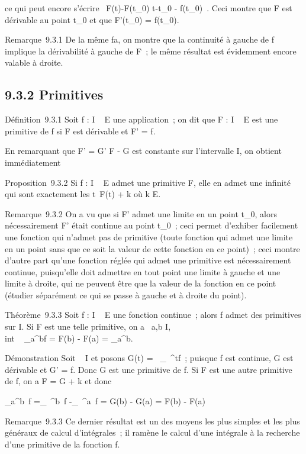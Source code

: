 \documentclass[]{article}
\begin{document}
ce qui peut encore s'écrire \
F(t)-F(t_0) \over t-t_0 -
f(t_0)\ \leq \epsilon. Ceci montre que F est
dérivable au point t_0 et que F'(t_0) =
f(t_0).

Remarque~9.3.1 De la même fa\ccon, on montre que la
continuité à gauche de f implique la dérivabilité à gauche de F~; le
même résultat est évidemment encore valable à droite.

\subsection{9.3.2 Primitives}

Définition~9.3.1 Soit f : I \rightarrow~ E une application~; on dit que F : I \rightarrow~ E
est une primitive de f si F est dérivable et F' = f.

En remarquant que F' = G' \Leftrightarrow F - G est
constante sur l'intervalle I, on obtient immédiatement

Proposition~9.3.2 Si f : I \rightarrow~ E admet une primitive F, elle en admet une
infinité qui sont exactement les t\mapsto~F(t) + k
où k \in E.

Remarque~9.3.2 On a vu que si F' admet une limite en un point
t_0, alors nécessairement F' était continue au point
t_0~; ceci permet d'exhiber facilement une fonction qui n'admet
pas de primitive (toute fonction qui admet une limite en un point sans
que ce soit la valeur de cette fonction en ce point)~; ceci montre
d'autre part qu'une fonction réglée qui admet une primitive est
nécessairement continue, puisqu'elle doit admettre en tout point une
limite à gauche et une limite à droite, qui ne peuvent être que la
valeur de la fonction en ce point (étudier séparément ce qui se passe à
gauche et à droite du point).

Théorème~9.3.3 Soit f : I \rightarrow~ E une fonction continue~; alors f admet des
primitives sur I. Si F est une telle primitive, on a
\forall~a,b \in I, \\int ~
_a^bf = F(b) - F(a) = \left
[F(t)\right ]_a^b.

Démonstration Soit \alpha~ \in I et posons G(t) =\int ~
_\alpha~^tf~; puisque f est continue, G est dérivable et G' = f.
Donc G est une primitive de f. Si F est une autre primitive de f, on a F
= G + k et donc

\int  _a^b~f
=\int  _\alpha~^b~f
-\int  _\alpha~^a~f = G(b) - G(a) = F(b)
- F(a)

Remarque~9.3.3 Ce dernier résultat est un des moyens les plus simples et
les plus généraux de calcul d'intégrales~; il ramène le calcul d'une
intégrale à la recherche d'une primitive de la fonction f.
\end{document}
